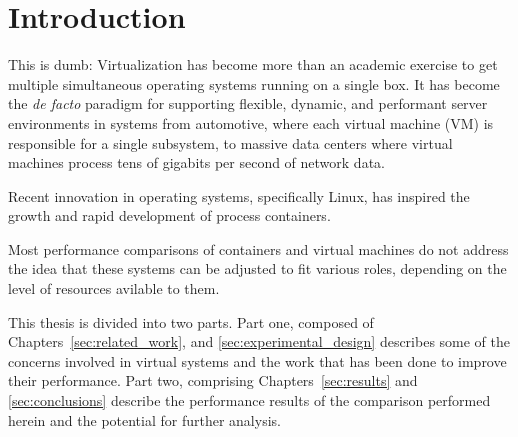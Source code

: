 \chapter{Introduction}
\label{sec:introduction}
This is dumb: Virtualization has become more than an academic exercise to get multiple simultaneous operating systems running on a single box.  
It has become the \emph{de facto} paradigm for supporting flexible, dynamic, and performant server environments in systems from automotive, where each virtual machine (VM) is responsible for a single subsystem, to massive data centers where virtual machines process tens of gigabits per second of network data.

Recent innovation in operating systems, specifically Linux, has inspired the growth and rapid development of process containers.

Most performance comparisons of containers and virtual machines do not address the idea that these systems can be adjusted to fit various roles, depending on the level of resources avilable to them.  


This thesis is divided into two parts.
Part one, composed of Chapters~\ref{sec:related_work}, and \ref{sec:experimental_design} describes some of the concerns involved in virtual systems and the work that has been done to improve their performance.
Part two, comprising Chapters~\ref{sec:results} and \ref{sec:conclusions} describe the performance results of the comparison performed herein and the potential for further analysis.
